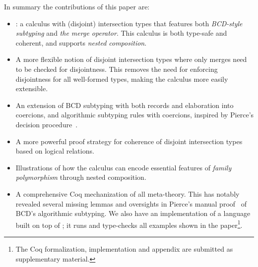In summary the contributions of this paper are:
\begin{itemize}

\item \name: a calculus with (disjoint) intersection types
that features both \emph{BCD-style subtyping} and \emph{the merge operator}.
This calculus is both type-safe and coherent, and supports \emph{nested
composition}. 

\item A more flexible notion of disjoint intersection types where 
only merges need to be checked for disjointness. This removes the need 
for enforcing disjointness for all well-formed types, making the
calculus more easily extensible.

\item An extension of BCD subtyping with both records and elaboration into coercions, 
  and
  algorithmic subtyping rules with coercions, inspired by
  Pierce's decision
  procedure~\cite{pierce1989decision}.

\item A more powerful proof strategy for coherence of disjoint
  intersection types based on logical
  relations. 

\item Illustrations of how the calculus can encode essential features 
of \emph{family polymorphism} through nested composition.

\item A comprehensive Coq mechanization of all meta-theory. This has notably revealed
  several missing lemmas and oversights
  in Pierce's manual proof~\cite{pierce1989decision} of BCD's algorithmic
  subtyping. %
  We also have an implementation of a language built on top of \name; it runs and type-checks all examples shown in
  the paper\footnote{The Coq formalization, implementation
    and appendix are submitted as supplementary material.}.


\end{itemize}

